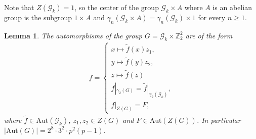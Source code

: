 \documentclass[a4paper, english, 9pt]{amsart}
\theoremstyle{plain}
\newtheorem{lemma}[theorem]{Lemma}
\theoremstyle{definition}
\def\aut#1{\mathrm{Aut}(#1)}
\def\Z{\mathbb Z}
\begin{document}
Note that $Z(\mathcal{G}_k)=1$, so the center of the group $\mathcal{G}_k\times A$ where $A$ is an abelian group is the subgroup $1\times A$ and $\gamma_n(\mathcal{G}_k\times A)=\gamma_n(\mathcal{G}_k)\times 1$ for every $n\geq 1$.
\begin{lemma}
    The automorphisms of the group $G=\mathcal{G}_k\times \Z_2^2$ are of the form
    \begin{align}\label{aut of G_k x Klein}
        f=\begin{cases}
          x\mapsto \widetilde{f}(x)z_1,\\
                  y\mapsto \widetilde{f}(y)z_2,\\
                  z\mapsto \widetilde{f}(z)\\   f|_{\gamma_2(G)}=\widetilde{f}|_{\gamma_2(\mathcal{G}_k)},\\
                  f|_{Z(G)}=F,
        \end{cases}
    \end{align}
    where $\widetilde{f}\in \aut{\mathcal{G}_k}$, $z_1,z_2\in Z(G)$ and $F\in \aut{Z(G)}$. In particular $|\aut{G}|= 2^8 \cdot 3^2\cdot p^2(p-1)$.
\end{lemma}
\end{document}

